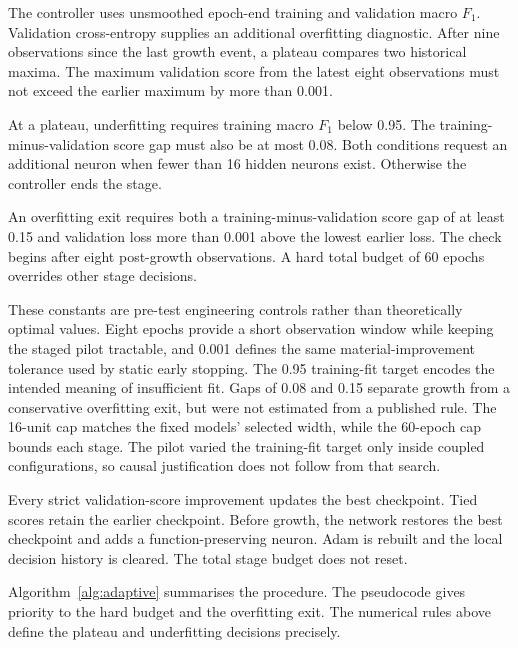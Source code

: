 \documentclass[conference,10pt]{IEEEtran}
\begin{document}
The controller uses unsmoothed epoch-end training and validation macro $F_1$. Validation cross-entropy supplies an additional overfitting diagnostic. After nine observations since the last growth event, a plateau compares two historical maxima. The maximum validation score from the latest eight observations must not exceed the earlier maximum by more than 0.001.

At a plateau, underfitting requires training macro $F_1$ below 0.95. The training-minus-validation score gap must also be at most 0.08. Both conditions request an additional neuron when fewer than 16 hidden neurons exist. Otherwise the controller ends the stage.

An overfitting exit requires both a training-minus-validation score gap of at least 0.15 and validation loss more than 0.001 above the lowest earlier loss. The check begins after eight post-growth observations. A hard total budget of 60 epochs overrides other stage decisions.

These constants are pre-test engineering controls rather than theoretically optimal values. Eight epochs provide a short observation window while keeping the staged pilot tractable, and 0.001 defines the same material-improvement tolerance used by static early stopping. The 0.95 training-fit target encodes the intended meaning of insufficient fit. Gaps of 0.08 and 0.15 separate growth from a conservative overfitting exit, but were not estimated from a published rule. The 16-unit cap matches the fixed models' selected width, while the 60-epoch cap bounds each stage. The pilot varied the training-fit target only inside coupled configurations, so causal justification does not follow from that search.

Every strict validation-score improvement updates the best checkpoint. Tied scores retain the earlier checkpoint. Before growth, the network restores the best checkpoint and adds a function-preserving neuron. Adam is rebuilt and the local decision history is cleared. The total stage budget does not reset.

Algorithm~\ref{alg:adaptive} summarises the procedure. The pseudocode gives priority to the hard budget and the overfitting exit. The numerical rules above define the plateau and underfitting decisions precisely.
\end{document}
